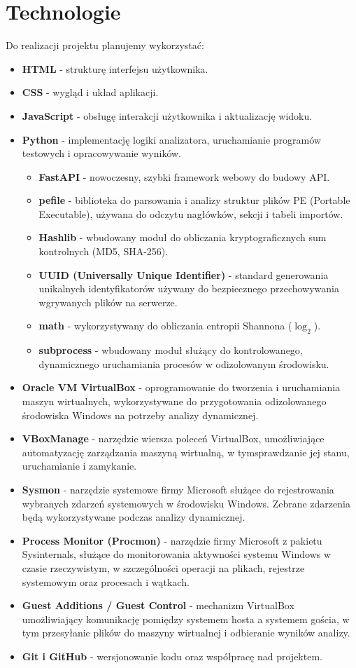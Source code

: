 \documentclass{article}
\begin{document}
\section{Technologie}
\label{sec:technologie}
Do realizacji projektu planujemy wykorzystać: 
\begin{itemize}
\item \textbf{HTML} - strukturę interfejsu użytkownika. 
\item \textbf{CSS} - wygląd i układ aplikacji. 
\item \textbf{JavaScript} - obsługę interakcji użytkownika i aktualizację widoku. 
\item \textbf{Python} - implementację logiki analizatora, uruchamianie programów testowych i opracowywanie wyników. 
\begin{itemize}
\item \textbf{FastAPI} - nowoczesny, szybki framework webowy do budowy API.
\item \textbf{pefile} - biblioteka do parsowania i analizy struktur plików PE (Portable Executable), używana do odczytu nagłówków, sekcji i tabeli importów.
\item \textbf{Hashlib} - wbudowany moduł do obliczania kryptograficznych sum kontrolnych (MD5, SHA-256).
\item \textbf{UUID (Universally Unique Identifier)} - standard generowania unikalnych identyfikatorów używany do bezpiecznego przechowywania wgrywanych plików na serwerze.
\item \textbf{math} - wykorzystywany do obliczania entropii Shannona ($\log_2$).   
\item \textbf{subprocess} - wbudowany moduł służący do kontrolowanego, dynamicznego uruchamiania procesów w odizolowanym środowisku. 
\end{itemize}
\item \textbf{Oracle VM VirtualBox} - oprogramowanie do tworzenia
i uruchamiania maszyn wirtualnych, wykorzystywane do przygotowania
odizolowanego środowiska Windows na potrzeby analizy dynamicznej.
\item \textbf{VBoxManage} - narzędzie wiersza poleceń VirtualBox, umożliwiające automatyzację zarządzania maszyną wirtualną, w tymsprawdzanie jej stanu, uruchamianie i zamykanie.
\item \textbf{Sysmon} - narzędzie systemowe firmy Microsoft służące do rejestrowania wybranych zdarzeń systemowych w środowisku Windows. Zebrane zdarzenia będą wykorzystywane podczas analizy dynamicznej.
\item \textbf{Process Monitor (Procmon)} - narzędzie firmy Microsoft z pakietu Sysinternals, służące do monitorowania aktywności systemu Windows w czasie rzeczywistym, w szczególności operacji na plikach, rejestrze systemowym oraz procesach i wątkach.
\item \textbf{Guest Additions / Guest Control} - mechanizm VirtualBox umożliwiający komunikację pomiędzy systemem hosta a systemem gościa, w tym przesyłanie plików do maszyny wirtualnej i odbieranie wyników analizy.
\item \textbf{Git i GitHub} - wersjonowanie kodu oraz współpracę nad projektem. 
\end{itemize}
\end{document}
